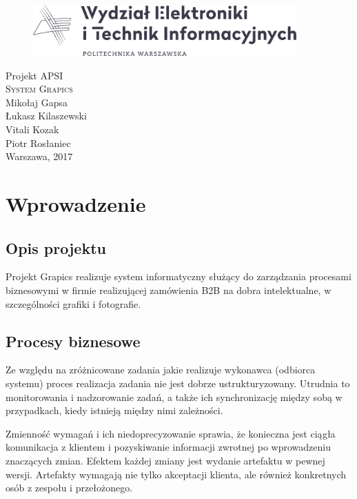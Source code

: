 \documentclass[12pt, oneside, final]{report}
\begin{document}
\begin{titlepage}
\centering
\begin{figure}
	\centering
	\includegraphics[width=0.9\textwidth]{logo.pdf}
\end{figure}
\vspace*{100pt}
\LARGE{Projekt APSI}\\
\vspace{30pt}
\textsc{\Huge{System Grapics}}\\
\vspace{120pt}
\Large{Mikołaj Gapsa}\\
\Large{Łukasz Kilaszewski}\\
\Large{Vitali Kozak}\\
\Large{Piotr Rosłaniec}\\
\vfill
\large{Warszawa, 2017}
\end{titlepage}

\thispagestyle{empty}
\tableofcontents
\cleardoublepage

\chapter{Wprowadzenie}
\section{Opis projektu}
Projekt Grapics realizuje system informatyczny służący do zarządzania procesami biznesowymi w firmie realizującej zamówienia B2B na dobra intelektualne, w szczególności grafiki i fotografie.

\section{Procesy biznesowe}
Ze względu na zróżnicowane zadania jakie realizuje wykonawca (odbiorca systemu) proces realizacja zadania nie jest dobrze ustrukturyzowany. Utrudnia to monitorowania i nadzorowanie zadań, a także ich synchronizację między sobą w przypadkach, kiedy istnieją między nimi zależności.

Zmienność wymagań i ich niedoprecyzowanie sprawia, że konieczna jest ciągła komunikacja z klientem i pozyskiwanie informacji zwrotnej po wprowadzeniu znaczących zmian. Efektem każdej zmiany jest wydanie artefaktu w pewnej wersji. Artefakty wymagają nie tylko akceptacji klienta, ale również konkretnych osób z zespołu i przełożonego. 
\end{document}
